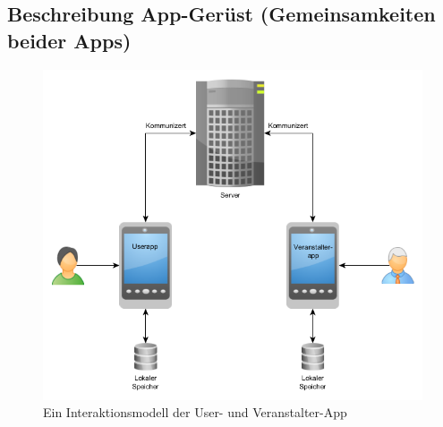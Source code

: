 \subsection{Beschreibung App-Gerüst (Gemeinsamkeiten beider Apps)}
\label{sec:appGeruest}
\begin{figure}[htb]
\centering
\includegraphics[width=\textwidth]{graphics/Interaktionsmodell.png}
\caption{Ein Interaktionsmodell der User- und Veranstalter-App}
\label{fig:UserAppUndVeranstalterAppInteraktionsmodell}
\end{figure}
